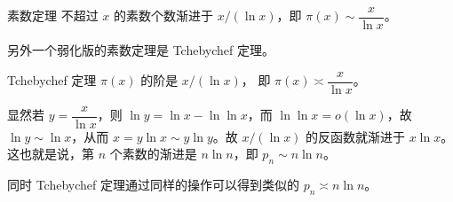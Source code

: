 
\begin{definition}{素数定理}
不超过 $x$ 的素数个数渐进于 $x / (\ln x)$，即 $\pi(x) \sim \dfrac{x}{\ln x}$。
\end{definition}
另外一个弱化版的素数定理是 Tchebychef 定理。
\begin{definition}{Tchebychef 定理}
$\pi(x)$ 的阶是 $x/(\ln x)$， 即 $\pi(x) \asymp \dfrac{x}{\ln x}$。
\end{definition}

显然若 $y = \dfrac x{\ln x}$，则 $\ln y = \ln x - \ln \ln x$，而 $\ln \ln x = o(\ln x)$，故 $\ln y \sim \ln x$，从而 $x = y \ln x \sim y \ln y$。故 $x/(\ln x)$ 的反函数就渐进于 $x \ln x$。这也就是说，第 $n$ 个素数的渐进是 $n \ln n$，即 $p_n \sim n \ln n$。

同时 Tchebychef 定理通过同样的操作可以得到类似的 $p_n \asymp n \ln n$。